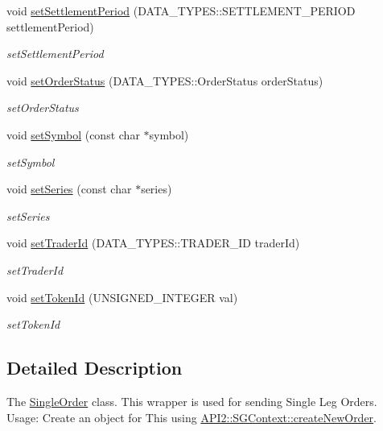 \begin{DoxyCompactItemize}
void \hyperlink{class_a_p_i2_1_1_single_order_af914d9b983de6435ba85dca1b3688b8b}{set\-Settlement\-Period} (D\-A\-T\-A\-\_\-\-T\-Y\-P\-E\-S\-::\-S\-E\-T\-T\-L\-E\-M\-E\-N\-T\-\_\-\-P\-E\-R\-I\-O\-D settlement\-Period)
\begin{DoxyCompactList}\small\item\em set\-Settlement\-Period \end{DoxyCompactList}\item 
void \hyperlink{class_a_p_i2_1_1_single_order_aec2e0123a97684d70a1b02e4e2c42b08}{set\-Order\-Status} (D\-A\-T\-A\-\_\-\-T\-Y\-P\-E\-S\-::\-Order\-Status order\-Status)
\begin{DoxyCompactList}\small\item\em set\-Order\-Status \end{DoxyCompactList}\item 
void \hyperlink{class_a_p_i2_1_1_single_order_a715489ec06c7713d7df2ca7d19b31dd0}{set\-Symbol} (const char $\ast$symbol)
\begin{DoxyCompactList}\small\item\em set\-Symbol \end{DoxyCompactList}\item 
void \hyperlink{class_a_p_i2_1_1_single_order_a247f75ccdba017be3ee525e7cac919a3}{set\-Series} (const char $\ast$series)
\begin{DoxyCompactList}\small\item\em set\-Series \end{DoxyCompactList}\item 
void \hyperlink{class_a_p_i2_1_1_single_order_a84b6c742e808c8897785a42f8bfcfe43}{set\-Trader\-Id} (D\-A\-T\-A\-\_\-\-T\-Y\-P\-E\-S\-::\-T\-R\-A\-D\-E\-R\-\_\-\-I\-D trader\-Id)
\begin{DoxyCompactList}\small\item\em set\-Trader\-Id \end{DoxyCompactList}\item 
void \hyperlink{class_a_p_i2_1_1_single_order_ada2c21e8603dfff7267657f2df1ce8c6}{set\-Token\-Id} (U\-N\-S\-I\-G\-N\-E\-D\-\_\-\-I\-N\-T\-E\-G\-E\-R val)
\begin{DoxyCompactList}\small\item\em set\-Token\-Id \end{DoxyCompactList}\end{DoxyCompactItemize}


\subsection{Detailed Description}
The \hyperlink{class_a_p_i2_1_1_single_order}{Single\-Order} class. This wrapper is used for sending Single Leg Orders. Usage\-: Create an object for This using \hyperlink{class_a_p_i2_1_1_s_g_context_ab141f05e2a0d8a51fdadc57bf53d2cd8}{A\-P\-I2\-::\-S\-G\-Context\-::create\-New\-Order}. 

